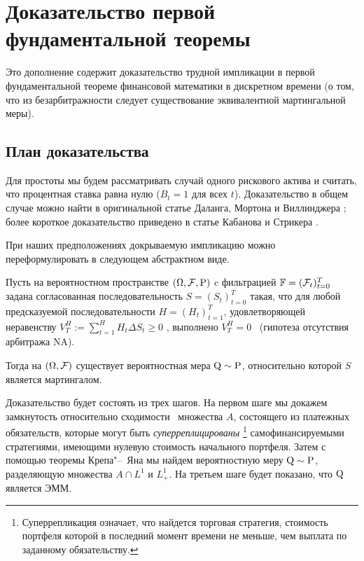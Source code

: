 \chapter{Доказательство первой фундаментальной теоремы}
\label{ch:ftap-proof}

Это дополнение содержит доказательство трудной импликации в первой фундаментальной теореме финансовой математики в дискретном времени (о том, что из безарбитражности следует существование эквивалентной мартингальной меры).


\section{План доказательства}

Для простоты мы будем рассматривать случай одного рискового актива и считать, что процентная ставка равна нулю ($B_t=1$ для всех $t$).
Доказательство в общем случае можно найти в оригинальной статье Даланга, Мортона и Виллинджера \cite{DalangMorton+90}; более короткое доказательство приведено в статье Кабанова и Стрикера \cite{KabanovStricker01}.

При наших предположениях докрываемую импликацию можно переформулировать в следующем абстрактном виде.

\begin{theorem}
\label{ftap-p:theorem}
Пусть на вероятностном пространстве $(\Omega,\mathcal{F},\mathrm{P})$ c фильтрацией $\mathbb{F}=(\mathcal{F}_t)_{t=0}^T$ задана согласованная последовательность $S=(S_t)_{t=0}^T$ такая, что для любой предсказуемой последовательности $H=(H_t)_{t=1}^T$, удовлетворяющей неравенству $V_T^H := \sum_{t=1}^H H_t \Delta S_t \ge 0$ \as, выполнено $V_T^H = 0$ \as\ (гипотеза отсутствия арбитража NA). 

Тогда на $(\Omega,\mathcal{F})$ существует вероятностная мера $\mathrm{Q}\sim\mathrm{P}$, относительно которой $S$ является мартингалом.
\end{theorem}

Доказательство будет состоять из трех шагов.
На первом шаге мы докажем замкнутость относительно сходимости \as\ множества $A$, состоящего из платежных обязательств, которые могут быть \emph{суперреплицированы}%
\footnote{Суперрепликация означает, что найдется торговая стратегия, стоимость портфеля которой в последний момент времени не меньше, чем выплата по заданному обязательству.} самофинансируемыми стратегиями, имеющими нулевую стоимость начального портфеля.  
Затем с помощью теоремы Крепа"--~Яна мы найдем вероятностную меру $\mathrm{Q}\sim\mathrm{P}$, разделяющую множества $A\cap L^1$ и $L_+^1$.
На третьем шаге будет показано, что $\mathrm{Q}$ является ЭММ.


